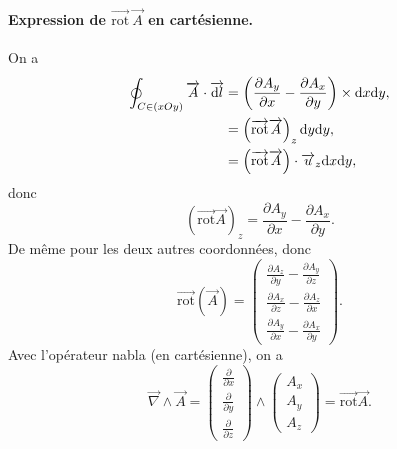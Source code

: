         \paragraph{Expression de $\vec{\mathrm{rot}}~\vec{A}$ en cartésienne.}

            On a 
            \begin{align*}
                \oint_{C\in(xOy)}\protect\overrightarrow{{A}}\cdot\protect\overrightarrow{{\mathrm{d} l}}
                &=\left(\frac{\partial A_y}{\partial x}-\frac{\partial A_x}{\partial y}\right)\times\mathrm{d} x\mathrm{d} y,\\
                &=
                \left(\protect\overrightarrow{{\mathrm{rot}}}\protect\overrightarrow{{A}}\right)_{z}\mathrm{d} y\mathrm{d} y,\\
                &=
                \left(\protect\overrightarrow{{\mathrm{rot}}}\protect\overrightarrow{{A}}\right)\cdot\protect\overrightarrow{{u}}_z\mathrm{d} x\mathrm{d} y,
            \end{align*}
            donc 
            \begin{equation*}
                \boxed{
                    \left(\vec{\mathrm{rot}}\vec{A}\right)_{z}=\frac{\partial A_y}{\partial x}-\frac{\partial A_x}{\partial y}.
                }
            \end{equation*}
            De même pour les deux autres coordonnées, donc 
            \begin{equation*}
                \boxed{
                    \vec{\mathrm{rot}}(\vec{A})=
                    \begin{pmatrix}
                        \frac{\partial A_z}{\partial y}-\frac{\partial A_y}{\partial z}\\
                        \frac{\partial A_x}{\partial z}-\frac{\partial A_z}{\partial x}\\
                        \frac{\partial A_y}{\partial x}-\frac{\partial A_x}{\partial y}
                    \end{pmatrix}.
                }
            \end{equation*}
            Avec l'opérateur nabla (en cartésienne), on a 
            \begin{equation*}
                \boxed{
                    \vec{\nabla}\wedge\vec{A}=\begin{pmatrix}
                        \frac{\partial}{\partial x}\\
                        \frac{\partial}{\partial y}\\
                        \frac{\partial}{\partial z}
                    \end{pmatrix}\wedge
                    \begin{pmatrix}
                        A_x\\A_y\\A_z
                    \end{pmatrix}=\vec{\mathrm{rot}}\vec{A}
                }.
            \end{equation*}


